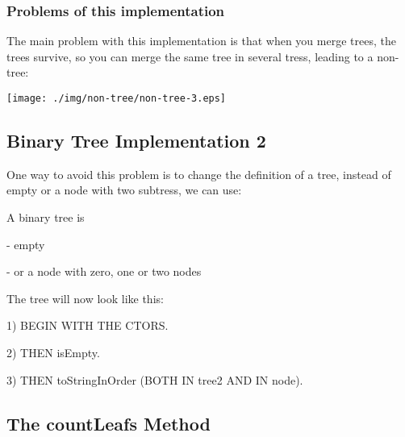 \documentclass[a4paper, 9pt]{extarticle}
\begin{document}
\newpage
\subsubsection{Problems of this implementation}

The main problem with this implementation is that when you merge trees, the
trees survive, so you can merge the same tree in several tress, leading to a
non-tree:

\begin{center}
  \texttt{[image: ./img/non-tree/non-tree-3.eps]}
\end{center}


\newpage
\subsection{Binary Tree Implementation 2}

One way to avoid this problem is to change the definition of a tree, instead of
empty or a node with two subtress, we can use:

\begin{blackboard}
A binary tree is

  - empty

  - or a node with zero, one or two nodes
\end{blackboard}

The tree will now look like this:


\newpage
\begin{multicols}{2}

  1) BEGIN WITH THE CTORS.

  2) THEN isEmpty.

  3) THEN toStringInOrder (BOTH IN tree2 AND IN node).
\end{multicols}




\newpage
\subsection{The countLeafs Method}

\begin{multicols}{2}
  \columnbreak
{}
\end{multicols}
\end{document}
